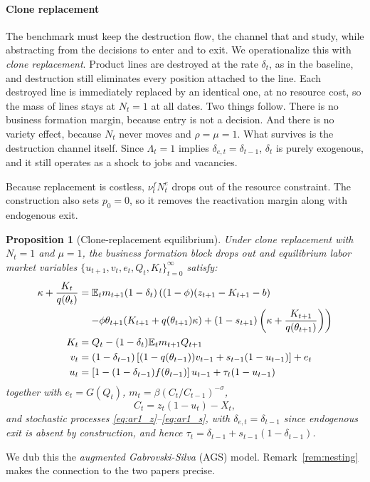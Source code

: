 \documentclass[authoryear, review, 12pt]{elsarticle}
\newtheorem{proposition}{Proposition}
\begin{document}
\paragraph{Clone replacement}
The benchmark must keep the destruction flow, the channel that \citet{coles_2018} and
\citet{gabrovski_2025} study, while abstracting from the decisions to enter and to exit.
We operationalize this with \emph{clone replacement}. Product lines
are destroyed at the rate $\delta_t$, as in the baseline, and destruction still eliminates
every position attached to the line. Each destroyed line is immediately replaced by an
identical one, at no resource cost, so the mass of lines stays at $N_t=1$ at all dates. Two
things follow. There is no business formation margin, because entry is not a decision.
And there is no variety effect, because $N_t$ never moves and $\rho=\mu=1$. What survives
is the destruction channel itself. Since $\Lambda_t=1$ implies $\delta_{e,t}=\delta_{t-1}$,
$\delta_t$ is purely exogenous, and it still operates as a shock to jobs and vacancies.

Because replacement is costless, $\nu_t^fN_t^e$ drops out of the resource constraint. The
construction also sets $p_0=0$, so it removes the reactivation margin along with
endogenous exit.

\begin{proposition}[Clone-replacement equilibrium]
	\label{prop:ags}
	Under clone replacement with $N_t=1$ and $\mu=1$, 
	the business formation block drops out and equilibrium 
	labor market variables 
	$\{u_{t+1},v_t,e_t,Q_t,K_t\}_{t=0}^\infty$ satisfy:
	\begin{align}
		\label{eq:jcc_ags}
		\kappa+\frac{K_t}{q(\theta_t)} &= 
		\mathbb{E}_t m_{t+1}(1-\delta_t)
		\left((1-\phi)(z_{t+1}-K_{t+1}-b) \right.\notag\\
		&\quad\left. -\phi\theta_{t+1}
		(K_{t+1}+q(\theta_{t+1})\kappa)
		+(1-s_{t+1})\left(\kappa+
		\frac{K_{t+1}}{q(\theta_{t+1})}\right)\right)\\
		\label{eq:K_ags}
		K_t &= Q_t-(1-\delta_t)\mathbb{E}_t 
		m_{t+1}Q_{t+1}\\
		\label{eq:v_ags}
		v_t &= (1-\delta_{t-1})
		\left[(1-q(\theta_{t-1}))v_{t-1}
		+s_{t-1}(1-u_{t-1})\right]+e_t\\
		\label{eq:u_ags}
		u_t &= \left[1-(1-\delta_{t-1})f(\theta_{t-1})\right]u_{t-1}
		+\tau_t(1-u_{t-1})
	\end{align}
	together with $e_t=G(Q_t)$,
	$m_t=\beta(C_t/C_{t-1})^{-\sigma}$,
	\begin{equation}\label{eq:rc_limit}
		C_t = z_t(1-u_t)-X_t,
	\end{equation}
	and stochastic processes
	\eqref{eq:ar1_z}--\eqref{eq:ar1_s}, with
	$\delta_{e,t}=\delta_{t-1}$ since endogenous exit
	is absent by construction, and hence
	$\tau_t=\delta_{t-1}+s_{t-1}(1-\delta_{t-1})$.
\end{proposition}
We dub this the \emph{augmented Gabrovski-Silva} (AGS) model. Remark~\ref{rem:nesting}
makes the connection to the two papers precise.
\end{document}
